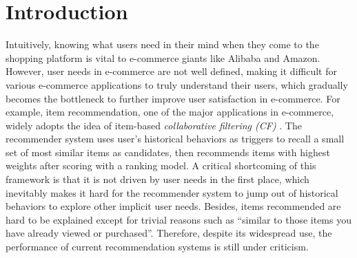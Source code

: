 \section{Introduction}
\label{sec:intro}


Intuitively, knowing what users need in their mind when they come to 
the shopping platform is vital to e-commerce giants like Alibaba and Amazon.
However, user needs in e-commerce are not well defined,
making it difficult for various e-commerce applications to truly understand their users, which gradually becomes the bottleneck to further improve user satisfaction in e-commerce.
For example, 
item recommendation, one of the major applications in e-commerce,
widely adopts the 
idea of item-based \textit{collaborative filtering (CF)} \cite{linden2003amazon, sarwar2001item}.
The recommender system uses user's historical behaviors as triggers to recall a small set of most similar items as candidates, 
then recommends items with highest weights after scoring with a ranking model. 
A critical shortcoming of this framework is that it is not driven by user needs 
in the first place, which inevitably makes
it hard for the recommender system to jump out of 
historical behaviors to explore other implicit user needs.
Besides, items recommended are hard to be explained 
except for trivial reasons such as ``similar to those items you have already viewed or purchased''.
Therefore, despite its widespread use,
the performance of current recommendation systems is still under criticism. 
